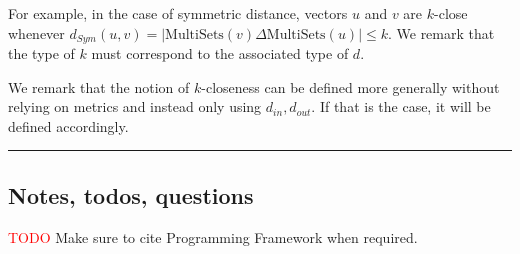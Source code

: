 \documentclass[11pt,a4paper]{article}
\theoremstyle{definition}
\newcommand{\horizline}{\noindent\rule{\textwidth}{1pt}}
\newcommand{\din}{d_{in}}
\newcommand{\dout}{d_{out}}
\newcommand{\todo}{{\textcolor{red}{TODO }}}
\begin{document}
For example, in the case of symmetric distance, vectors $u$ and $v$ are $k$-close whenever $d_{Sym}(u, v) = |\textrm{MultiSets}(v) \Delta \textrm{MultiSets}(u)| \leq k$. We remark that the type of $k$ must correspond to the associated type of $d$.

We remark that the notion of $k$-closeness can be defined more generally without relying on metrics and instead only using $\din, \dout$. If that is the case, it will be defined accordingly.

\horizline

\subsection{Notes, todos, questions}

\todo{Make sure to cite Programming Framework when required.}
\end{document}
